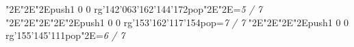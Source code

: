 \null\vfill\enskip\enskip\enskip\enskip\enskip\enskip\enskip\enskip\enskip\ipa\char"2E\enskip\enskip\enskip\enskip\enskip\enskip\enskip\enskip\enskip\ipa\char"2E\enskip\enskip\enskip\ipa\char"2E\enskip\enskip\enskip\enskip\enskip\enskip\enskip\enskip\enskip\bigskip\pdfcolorstack\match push{1 0 0 rg}\ipa\char'142\ipa\char'063\ipa\char'162\ipa\char'144\ipa\char'172\pdfcolorstack\match pop{}\ipa\char"2E\enskip\enskip\enskip\enskip\enskip\enskip\enskip\enskip\enskip\ipa\char"2E\enskip\enskip\enskip\enskip\enskip\enskip\enskip\enskip\enskip\enskip\enskip\enskip\bigskip\vfill\footline={\hfill\tenrm\it 5 / 7}\eject
\null\vfill\enskip\enskip\enskip\enskip\enskip\enskip\enskip\enskip\enskip\ipa\char"2E\enskip\enskip\enskip\enskip\enskip\enskip\enskip\enskip\enskip\ipa\char"2E\enskip\enskip\enskip\ipa\char"2E\enskip\enskip\enskip\enskip\enskip\enskip\enskip\enskip\enskip\bigskip\enskip\enskip\enskip\enskip\enskip\enskip\enskip\enskip\enskip\enskip\enskip\enskip\enskip\enskip\enskip\ipa\char"2E\enskip\enskip\enskip\enskip\enskip\enskip\enskip\enskip\enskip\ipa\char"2E\pdfcolorstack\match push{1 0 0 rg}\ipa\char'153\ipa\char'162\ipa\char'117\ipa\char'154\pdfcolorstack\match pop{}\bigskip\vfill\footline={\hfill\tenrm\it 7 / 7}\eject
\null\vfill\enskip\enskip\enskip\enskip\enskip\enskip\enskip\enskip\enskip\ipa\char"2E\enskip\enskip\enskip\enskip\enskip\enskip\enskip\enskip\enskip\ipa\char"2E\enskip\enskip\enskip\ipa\char"2E\enskip\enskip\enskip\enskip\enskip\enskip\enskip\enskip\enskip\bigskip\enskip\enskip\enskip\enskip\enskip\enskip\enskip\enskip\enskip\enskip\enskip\enskip\enskip\enskip\enskip\ipa\char"2E\pdfcolorstack\match push{1 0 0 rg}\ipa\char'155\ipa\char'145\ipa\char'111\pdfcolorstack\match pop{}\ipa\char"2E\enskip\enskip\enskip\enskip\enskip\enskip\enskip\enskip\enskip\enskip\enskip\enskip\bigskip\vfill\footline={\hfill\tenrm\it 6 / 7}\eject\bye